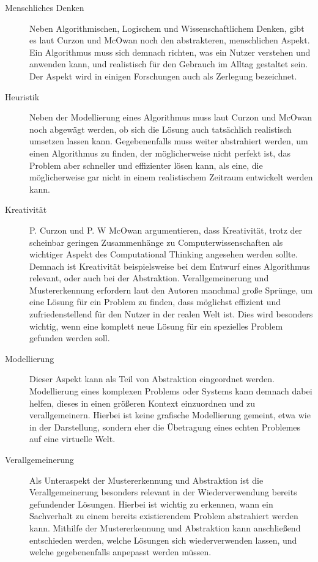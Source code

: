\begin{description}
    \item[Menschliches Denken] Neben Algorithmischen, Logischem und Wissenschaftlichem Denken, gibt es laut Curzon und McOwan \cite{curzon} noch den abstrakteren, menschlichen Aspekt. Ein Algorithmus muss sich demnach richten, was ein Nutzer verstehen und anwenden kann, und realistisch für den Gebrauch im Alltag gestaltet sein. Der Aspekt wird in einigen Forschungen auch als Zerlegung bezeichnet.
    \item[Heuristik] Neben der Modellierung eines Algorithmus muss laut Curzon und McOwan noch abgewägt werden, ob sich die Lösung auch tatsächlich realistisch umsetzen lassen kann. Gegebenenfalls muss weiter abstrahiert werden, um einen Algorithmus zu finden, der möglicherweise nicht perfekt ist, das Problem aber schneller und effizienter lösen kann, als eine, die möglicherweise gar nicht in einem realistischem Zeitraum entwickelt werden kann.
    \item[Kreativität] P. Curzon und P. W McOwan argumentieren, dass Kreativität, trotz der scheinbar geringen Zusammenhänge zu Computerwissenschaften als wichtiger Aspekt des Computational Thinking angesehen werden sollte. Demnach ist Kreativität beispielsweise bei dem Entwurf eines Algorithmus relevant, oder auch bei der Abstraktion. Verallgemeinerung und Mustererkennung erfordern laut den Autoren manchmal große Sprünge, um eine Lösung für ein Problem zu finden, dass möglichst effizient und zufriedenstellend für den Nutzer in der realen Welt ist. Dies wird besonders wichtig, wenn eine komplett neue Lösung für ein spezielles Problem gefunden werden soll.
    \item[Modellierung] Dieser Aspekt kann als Teil von Abstraktion eingeordnet werden. Modellierung eines komplexen Problems oder Systems kann demnach dabei helfen, dieses in einen größeren Kontext einzuordnen und zu verallgemeinern. Hierbei ist keine grafische Modellierung gemeint, etwa wie in der Darstellung, sondern eher die Übetragung eines echten Problemes auf eine virtuelle Welt.
    \item[Verallgemeinerung] Als Unteraspekt der Mustererkennung und Abstraktion ist die Verallgemeinerung besonders relevant in der Wiederverwendung bereits gefundender Lösungen. Hierbei ist wichtig zu erkennen, wann ein Sachverhalt zu einem bereits existierendem Problem abstrahiert werden kann. Mithilfe der Mustererkennung und Abstraktion kann anschließend entschieden werden, welche Lösungen sich wiederverwenden lassen, und welche gegebenenfalls anpepasst werden müssen.

\end{description}
